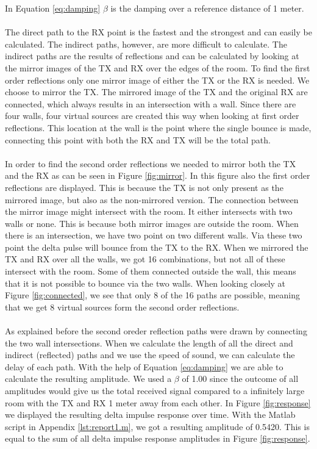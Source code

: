 \documentclass[final]{scrreprt} %
\begin{document}
In Equation \ref{eq:damping} $\beta$ is the damping over a reference distance of 1 meter. 
\\
\\
The direct path to the RX point is the fastest and the strongest and can easily be calculated.
The indirect paths, however, are more difficult to calculate.
The indirect paths are the results of reflections and can be calculated by looking at the mirror images of the TX and RX over the edges of the room. 
To find the first order reflections only one mirror image of either the TX or the RX is needed. 
We choose to mirror the TX.
The mirrored image of the TX and the original RX are connected, which always results in an intersection with a wall.
Since there are four walls, four virtual sources are created this way when looking at first order reflections.
This location at the wall is the point where the single bounce is made, connecting this point with both the RX and TX will be the total path.
\\ 
\\
In order to find the second order reflections we needed to mirror both the TX and the RX as can be seen in Figure \ref{fig:mirror}.
In this figure also the first order reflections are displayed. 
This is because the TX is not only present as the mirrored image, but also as the non-mirrored version. 
The connection between the mirror image might intersect with the room.
It either intersects with two walls or none. 
This is because both mirror images are outside the room.
When there is an intersection, we have two point on two different walls. 
Via these two point the delta pulse will bounce from the TX to the RX. 
When we mirrored the TX and RX over all the walls, we got 16 combinations, but not all of these intersect with the room. 
Some of them connected outside the wall, this means that it is not possible to bounce via the two walls. 
When looking closely at Figure \ref{fig:connected}, we see that only 8 of the 16 paths are possible, meaning that we get 8 virtual sources form the second order reflections. 
\\ 
\\
As explained before the second oreder reflection paths were drawn by connecting the two wall intersections. 
When we calculate the length of all the direct and indirect (reflected) paths and we use the speed of sound, we can calculate the delay of each path.
With the help of Equation \ref{eq:damping} we are able to calculate the resulting amplitude. 
We used a $\beta$ of 1.00 since the outcome of all amplitudes would give us the total received signal compared to a infinitely large room with the TX and RX 1 meter away from each other.
In Figure \ref{fig:response} we displayed the resulting delta impulse response over time. 
With the Matlab script in Appendix \ref{lst:report1.m}, we got a resulting amplitude of 0.5420. 
This is equal to the sum of all delta impulse response amplitudes in Figure \ref{fig:response}.
\end{document}
